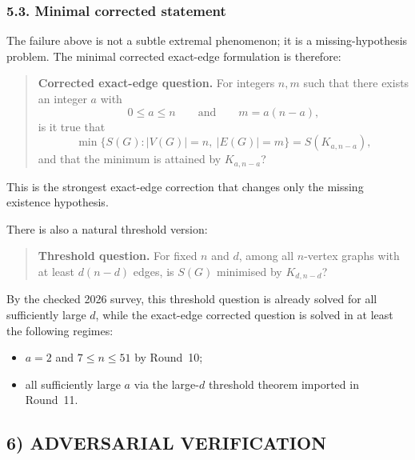 \subsubsection*{5.3. Minimal corrected statement}

The failure above is not a subtle extremal phenomenon; it is a missing-hypothesis problem.
The minimal corrected exact-edge formulation is therefore:

\begin{quote}
\textbf{Corrected exact-edge question.}
For integers $n,m$ such that there exists an integer $a$ with
\[
0\le a\le n
\qquad\text{and}\qquad
m=a(n-a),
\]
is it true that
\[
\min\{S(G):|V(G)|=n,\ |E(G)|=m\}=S(K_{a,n-a}),
\]
and that the minimum is attained by $K_{a,n-a}$?
\end{quote}

This is the strongest exact-edge correction that changes only the missing existence hypothesis.

There is also a natural threshold version:
\begin{quote}
\textbf{Threshold question.}
For fixed $n$ and $d$, among all $n$-vertex graphs with at least $d(n-d)$ edges, is $S(G)$ minimised by $K_{d,n-d}$?
\end{quote}

By the checked 2026 survey, this threshold question is already solved for all sufficiently large $d$, while the exact-edge corrected question is solved in at least the following regimes:
\begin{itemize}
\item $a=2$ and $7\le n\le 51$ by Round~10;
\item all sufficiently large $a$ via the large-$d$ threshold theorem imported in Round~11.
\end{itemize}

\subsection*{6) ADVERSARIAL VERIFICATION}

